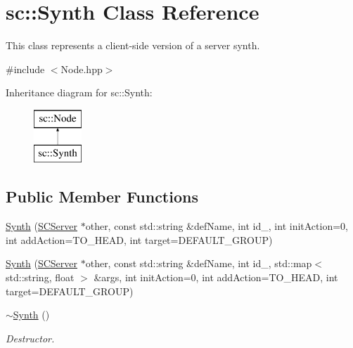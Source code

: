 \hypertarget{classsc_1_1Synth}{\section{sc\-:\-:Synth Class Reference}
\label{classsc_1_1Synth}
}


This class represents a client-\/side version of a server synth.  




{\ttfamily \#include $<$Node.\-hpp$>$}

Inheritance diagram for sc\-:\-:Synth\-:\begin{figure}[H]
\begin{center}
\leavevmode
\includegraphics[height=2.000000cm]{classsc_1_1Synth}
\end{center}
\end{figure}
\subsection*{Public Member Functions}
\begin{DoxyCompactItemize}
\item 
\hyperlink{classsc_1_1Synth_ab3bf5c5976bd7c0bcbaa8cae4cb4be8d}{Synth} (\hyperlink{classsc_1_1SCServer}{S\-C\-Server} $\ast$other, const std\-::string \&def\-Name, int id\-\_\-, int init\-Action=0, int add\-Action=T\-O\-\_\-\-H\-E\-A\-D, int target=D\-E\-F\-A\-U\-L\-T\-\_\-\-G\-R\-O\-U\-P)
\item 
\hyperlink{classsc_1_1Synth_af48d7363fd76ffe704559705f5011328}{Synth} (\hyperlink{classsc_1_1SCServer}{S\-C\-Server} $\ast$other, const std\-::string \&def\-Name, int id\-\_\-, std\-::map$<$ std\-::string, float $>$ \&args, int init\-Action=0, int add\-Action=T\-O\-\_\-\-H\-E\-A\-D, int target=D\-E\-F\-A\-U\-L\-T\-\_\-\-G\-R\-O\-U\-P)
\item 
\hypertarget{classsc_1_1Synth_a1b52cbfb16f211e3d5ae909eed6420eb}{\hyperlink{classsc_1_1Synth_a1b52cbfb16f211e3d5ae909eed6420eb}{$\sim$\-Synth} ()}\label{classsc_1_1Synth_a1b52cbfb16f211e3d5ae909eed6420eb}

\begin{DoxyCompactList}\small\item\em Destructor. \end{DoxyCompactList}\end{DoxyCompactItemize}


